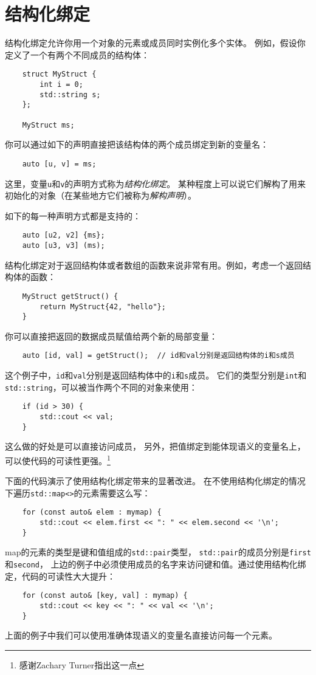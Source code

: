 \chapter{结构化绑定}\label{ch1}
结构化绑定允许你用一个对象的元素或成员同时实例化多个实体。
例如，假设你定义了一个有两个不同成员的结构体：
\begin{lstlisting}
    struct MyStruct {
        int i = 0;
        std::string s;
    };

    MyStruct ms;
\end{lstlisting}
你可以通过如下的声明直接把该结构体的两个成员绑定到新的变量名：
\begin{lstlisting}
    auto [u, v] = ms;
\end{lstlisting}
这里，变量\texttt{u}和\texttt{v}的声明方式称为\emph{结构化绑定}。
某种程度上可以说它们解构了用来初始化的对象（在某些地方它们被称为\emph{解构声明}）。

如下的每一种声明方式都是支持的：
\begin{lstlisting}
    auto [u2, v2] {ms};
    auto [u3, v3] (ms);
\end{lstlisting}
结构化绑定对于返回结构体或者数组的函数来说非常有用。例如，考虑一个返回结构体的函数：
\begin{lstlisting}
    MyStruct getStruct() {
        return MyStruct{42, "hello"};
    }
\end{lstlisting}
你可以直接把返回的数据成员赋值给两个新的局部变量：
\begin{lstlisting}
    auto [id, val] = getStruct();  // id和val分别是返回结构体的i和s成员
\end{lstlisting}
这个例子中，\texttt{id}和\texttt{val}分别是返回结构体中的\texttt{i}和\texttt{s}成员。
它们的类型分别是\texttt{int}和\texttt{std::string}，可以被当作两个不同的对象来使用：
\begin{lstlisting}
    if (id > 30) {
        std::cout << val;
    }
\end{lstlisting}
这么做的好处是可以直接访问成员，
另外，把值绑定到能体现语义的变量名上，可以使代码的可读性更强。\footnote{感谢Zachary Turner指出这一点}

下面的代码演示了使用结构化绑定带来的显著改进。
在不使用结构化绑定的情况下遍历\texttt{std::map<>}的元素需要这么写：
\begin{lstlisting}
    for (const auto& elem : mymap) {
        std::cout << elem.first << ": " << elem.second << '\n';
    }
\end{lstlisting}
map的元素的类型是键和值组成的\texttt{std::pair}类型，
\texttt{std::pair}的成员分别是\texttt{first}和\texttt{second}，
上边的例子中必须使用成员的名字来访问键和值。通过使用结构化绑定，代码的可读性大大提升：
\begin{lstlisting}
    for (const auto& [key, val] : mymap) {
        std::cout << key << ": " << val << '\n';
    }
\end{lstlisting}
上面的例子中我们可以使用准确体现语义的变量名直接访问每一个元素。

